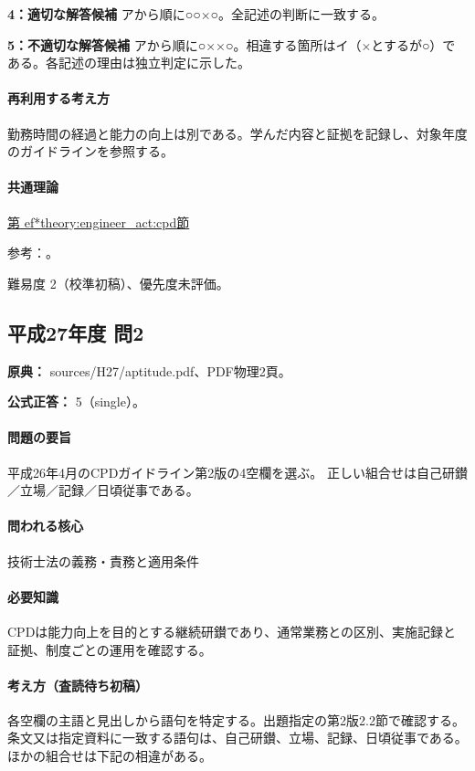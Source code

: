 \noindent\textbf{4：適切な解答候補} アから順に○○×○。全記述の判断に一致する。\par

\noindent\textbf{5：不適切な解答候補} アから順に○××○。相違する箇所はイ（×とするが○）である。各記述の理由は独立判定に示した。\par

\paragraph{再利用する考え方} 勤務時間の経過と能力の向上は別である。学んだ内容と証拠を記録し、対象年度のガイドラインを参照する。

\paragraph{共通理論} \hyperref[theory:engineer_act:cpd]{第
ef*{theory:engineer_act:cpd}節}

\par 参考：\cite{cpd_v1}。

\par 難易度 2（校準初稿）、優先度未評価。

\subsection{平成27年度 問2}
\label{q:h27-reg-apt-02}

\noindent\textbf{原典：} sources/H27/aptitude.pdf、PDF物理2頁。

\textbf{公式正答：} 5（single）。

\paragraph{問題の要旨} 平成26年4月のCPDガイドライン第2版の4空欄を選ぶ。 正しい組合せは自己研鑚／立場／記録／日頃従事である。

\paragraph{問われる核心} 技術士法の義務・責務と適用条件

\paragraph{必要知識} CPDは能力向上を目的とする継続研鑚であり、通常業務との区別、実施記録と証拠、制度ごとの運用を確認する。

\paragraph{考え方（査読待ち初稿）} 各空欄の主語と見出しから語句を特定する。出題指定の第2版2.2節で確認する。 条文又は指定資料に一致する語句は、自己研鑚、立場、記録、日頃従事である。ほかの組合せは下記の相違がある。

